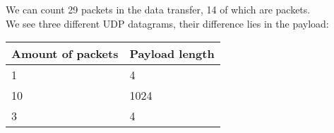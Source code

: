 We can count 29 packets in the data transfer, 14 of which are packets. \\
We see three different UDP datagrams, their difference lies in the payload: \\

\begin{center}
\begin{tabular}{| l | l |}
    \hline
    Amount of packets & Payload length \\ \hline
    1 & 4 \\ \hline
    10 & 1024 \\ \hline
    3 & 4 \\ \hline
\end{tabular}
\end{center}
